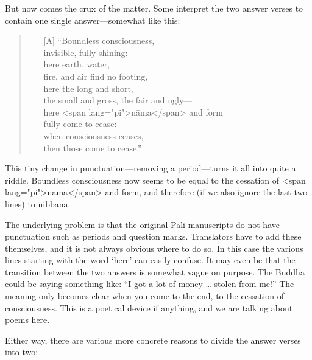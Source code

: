 \documentclass[10pt, openright]{book}
\begin{document}
\vspace* {1em}\noindent
But now comes the crux of the matter. Some interpret the two answer verses to contain one single answer—somewhat like this:


\begin{quote}


\begin{itemize}

\item[{[A]}]“Boundless consciousness, \\ invisible, fully shining: \\ here earth, water, \\ fire, and air find no footing, \\ here the long and short, \\ the small and gross, the fair and ugly— \\ here <span lang="pi">nāma</span> and form \\ fully come to cease: \\ when consciousness ceases, \\ then those come to cease.”

\end{itemize}

\end{quote}
This tiny change in punctuation—removing a period—turns it all into quite a riddle. Boundless consciousness now seems to be equal to the cessation of <span lang="pi">nāma</span> and form, and therefore (if we also ignore the last two lines) to nibbāna.


The underlying problem is that the original Pali manuscripts do not have punctuation such as periods and question marks. Translators have to add these themselves, and it is not always obvious where to do so. In this case the various lines starting with the word ‘here’ can easily confuse. It may even be that the transition between the two answers is somewhat vague on purpose. The Buddha could be saying something like: “I got a lot of money … stolen from me!” The meaning only becomes clear when you come to the end, to the cessation of consciousness. This is a poetical device if anything, and we are talking about poems here.


Either way, there are various more concrete reasons to divide the answer verses into two:
\end{document}
